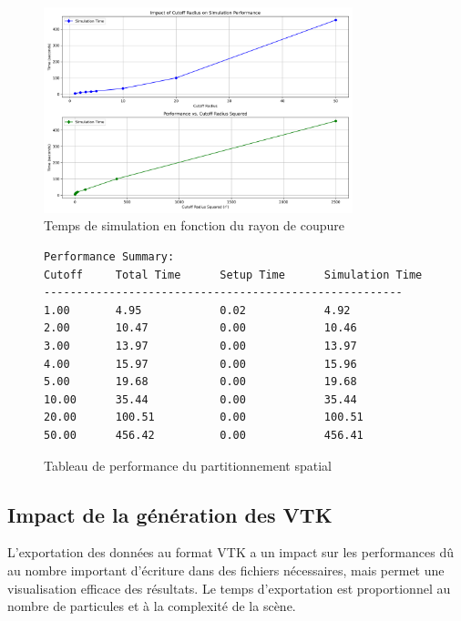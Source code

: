 \documentclass[12pt,a4paper]{article}
\begin{document}
\begin{figure}[H]
\centering
\includegraphics[width=0.8\textwidth]{perf/cutoff_radius_performance.png}
\caption{Temps de simulation en fonction du rayon de coupure}
\end{figure}

\begin{figure}[H]
\centering
\begin{minipage}{\textwidth}
\begin{verbatim}
Performance Summary:
Cutoff     Total Time      Setup Time      Simulation Time
-------------------------------------------------------
1.00       4.95            0.02            4.92           
2.00       10.47           0.00            10.46          
3.00       13.97           0.00            13.97          
4.00       15.97           0.00            15.96          
5.00       19.68           0.00            19.68          
10.00      35.44           0.00            35.44          
20.00      100.51          0.00            100.51         
50.00      456.42          0.00            456.41    
\end{verbatim}
\end{minipage}
\caption{Tableau de performance du partitionnement spatial}
\end{figure}

\subsection{Impact de la génération des VTK}
L'exportation des données au format VTK a un impact sur les performances dû au nombre important d'écriture dans des fichiers nécessaires, mais permet une visualisation efficace des résultats. Le temps d'exportation est proportionnel au nombre de particules et à la complexité de la scène.
\end{document}
